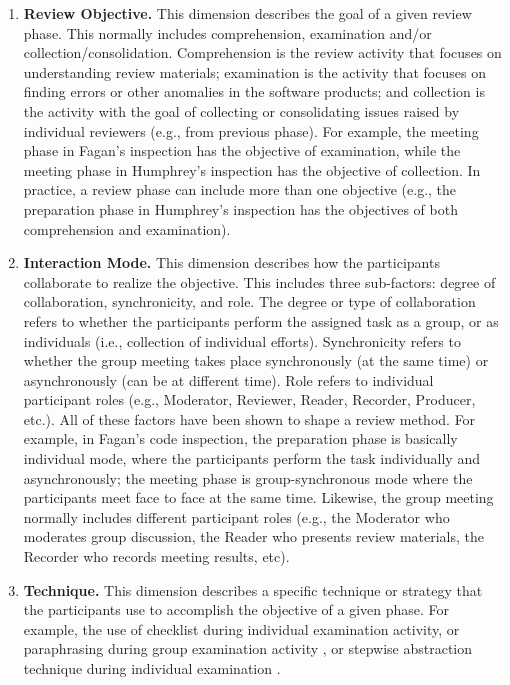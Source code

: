 \begin{enumerate}
\item {\bf Review Objective.} This dimension describes the goal
of a given review phase. This normally includes comprehension,
examination and/or collection/consolidation. Comprehension is the
review activity that focuses on understanding review materials;
examination is the activity that focuses on finding errors or other
anomalies in the software products; and collection is the activity
with the goal of collecting or consolidating issues
raised by individual reviewers (e.g., from previous phase). 
For example, the meeting phase in Fagan's
inspection \cite{Fagan76} has the objective of examination, while the
meeting phase in Humphrey's inspection \cite{Humphrey90} has the
objective of collection. 
In practice, a review phase can include more than one objective (e.g.,
the preparation phase in Humphrey's inspection has the
objectives of both comprehension and examination).

\item {\bf Interaction Mode.} This dimension describes how the
participants collaborate to realize the objective. This includes three
sub-factors: degree of collaboration, synchronicity, and role. The
degree or type of collaboration refers to whether the participants
perform the 
assigned task as a group, or as  individuals (i.e., collection of
individual efforts).  
Synchronicity refers to whether the group meeting takes place
synchronously (at the same time) or asynchronously (can be at
different time). Role refers to 
individual participant roles (e.g., Moderator, Reviewer, Reader,
Recorder, Producer, etc.). 
All of these factors have been shown to shape a review method.
For example, in Fagan's code inspection, the preparation phase is
basically individual mode, where the participants perform the task
individually and asynchronously; the meeting phase is
group-synchronous mode where the participants meet face to face at the
same time.
Likewise, the group meeting normally includes different participant
roles (e.g., the Moderator who moderates group discussion, the
Reader who presents 
review materials, the Recorder who records meeting results, etc).


\item {\bf Technique.}
This dimension describes a specific technique or strategy that the
participants use to accomplish the objective of a given phase.
For example, the use of checklist during individual examination
activity, or paraphrasing during group examination activity
\cite{Fagan76}, or stepwise abstraction technique during individual
examination \cite{Basili85}.

\end{enumerate}

